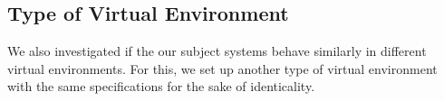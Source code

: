 \subsection{Type of Virtual Environment}

We also investigated if the our subject systems behave similarly in different virtual environments. For this, we set up another type of virtual environment with the same specifications for the sake of identicality.  
\\
\\
